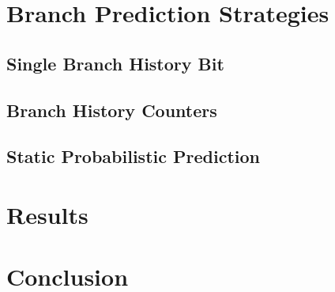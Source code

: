 \documentclass[12pt, twocolumn]{article}
\begin{document}
\section{Branch Prediction Strategies}
\subsection{Single Branch History Bit}
\subsection{Branch History Counters}
\subsection{Static Probabilistic Prediction}
\section{Results}
\section{Conclusion}
\end{document}
